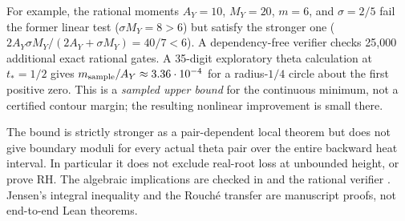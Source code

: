 For example, the rational moments
$A_Y=10$, $M_Y=20$, $m=6$, and
$\sigma=2/5$ fail the former linear
test ($\sigma M_Y=8>6$) but satisfy
the stronger one
($2A_Y\sigma M_Y/(2A_Y+\sigma M_Y)
=40/7<6$). A dependency-free
verifier checks 25,000 additional
exact rational gates. A
35-digit exploratory theta
calculation at $t_*=1/2$
gives $m_{\rm sample}/A_Y\approx
3.36\cdot10^{-4}$ for a
radius-$1/4$ circle about the first
positive zero. This is a
\emph{sampled upper bound} for the
continuous minimum, not a
certified contour margin;
the resulting nonlinear
improvement is small there.

The bound is strictly stronger as a
pair-dependent local theorem but does
not give boundary moduli for every
actual theta pair over the entire
backward heat interval. In particular
it does not exclude real-root loss
at unbounded height, or prove RH.
The algebraic implications are checked in
and the rational verifier
.
Jensen's integral inequality and
the Rouch\'e transfer are manuscript
proofs, not end-to-end Lean theorems.
